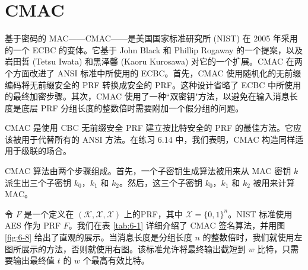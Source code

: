 \section{CMAC}\label{sec:6-10}

基于密码的 MAC——CMAC——是美国国家标准研究所 (NIST) 在 2005 年采用的一个 ECBC 的变体。它基于 John Black 和 Phillip Rogaway 的一个提案，以及岩田哲 (Tetsu Iwata) 和黑泽馨 (Kaoru Kurosawa) 对它的一个扩展。CMAC 在两个方面改进了 ANSI 标准中所使用的 ECBC。首先，CMAC 使用随机化的无前缀编码将无前缀安全的 PRF 转换成安全的 PRF。这种设计省略了 ECBC 中所使用的最终加密步骤。其次，CMAC 使用了一种``双密钥"方法，以避免在输入消息长度是底层 PRF 分组长度的整数倍时需要附加一个假分组的问题。

CMAC 是使用 CBC 无前缀安全 PRF 建立按比特安全的 PRF 的最佳方法。它应该被用于代替所有的 ANSI 方法。在练习 6.14 中，我们表明，CMAC 构造同样适用于级联的场合。

\begin{snote}
CMAC 算法由两个步骤组成。首先，一个子密钥生成算法被用来从 MAC 密钥 $k$ 派生出三个子密钥 $k_0$，$k_1$ 和 $k_2$。然后，这三个子密钥 $k_0$，$k_1$ 和 $k_2$ 被用来计算 MAC。

令 $F$ 是一个定义在 $(\mathcal{K},\mathcal{X},\mathcal{X})$ 上的PRF，其中 $\mathcal{X}=\{0,1\}^n$。NIST 标准使用 AES 作为 PRF $F$。我们在表 \ref{tab:6-1} 详细介绍了 CMAC 签名算法，并用图 \ref{fig:6-8} 给出了直观的展示。当消息长度是分组长度 $n$ 的整数倍时，我们就使用左图所展示的方法，否则就使用右图。该标准允许将最终输出截短到 $w$ 比特，只需要输出最终值 $t$ 的 $w$ 个最高有效比特。
\end{snote}

